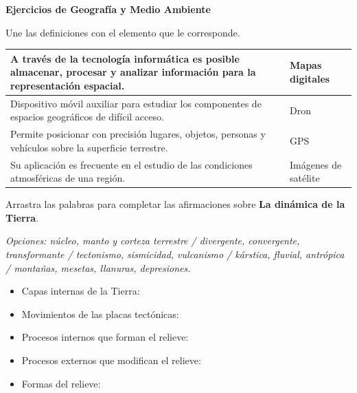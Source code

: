 \documentclass[11pt, a4paper, answers]{exam}
\begin{document}
\begin{center}
    {\Large \textbf{Ejercicios de Geografía y Medio Ambiente}} \\
    \vspace{0.5cm}
\end{center}

\begin{questions}

\question Une las definiciones con el elemento que le corresponde.

\vspace{0.3cm}
\begin{center}
\renewcommand{\arraystretch}{1.5}
\begin{tabular}{|p{9cm}|p{5cm}|}
\hline
A través de la tecnología informática es posible almacenar, procesar y analizar información para la representación espacial. & Mapas digitales \\ \hline
Dispositivo móvil auxiliar para estudiar los componentes de espacios geográficos de difícil acceso. & Dron \\ \hline
Permite posicionar con precisión lugares, objetos, personas y vehículos sobre la superficie terrestre. & GPS \\ \hline
Su aplicación es frecuente en el estudio de las condiciones atmosféricas de una región. & Imágenes de satélite \\ \hline
\end{tabular}
\end{center}
\vspace{0.5cm}

\question Arrastra las palabras para completar las afirmaciones sobre \textbf{La dinámica de la Tierra}. 

\textit{Opciones: núcleo, manto y corteza terrestre / divergente, convergente, transformante / tectonismo, sismicidad, vulcanismo / kárstica, fluvial, antrópica / montañas, mesetas, llanuras, depresiones.}

\begin{itemize}[label=--]
    \item Capas internas de la Tierra: 
    \item Movimientos de las placas tectónicas: 
    \item Procesos internos que forman el relieve: 
    \item Procesos externos que modifican el relieve: 
    \item Formas del relieve: 
\end{itemize}
\vspace{0.5cm}


\end{questions}
\end{document}
